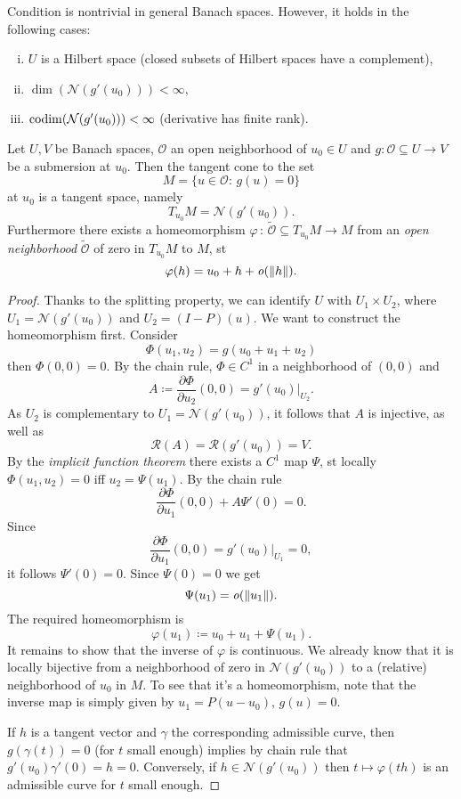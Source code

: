 \documentclass[../skript.tex]{subfiles}
\begin{document}
\begin{remarknonumb}
	Condition  is nontrivial in general Banach spaces. However, it holds in the following cases:
	\begin{enumerate}[(i)]
		\item $U$ is a Hilbert space (closed subsets of Hilbert spaces have a complement),
		\item $\dim(\mathcal{N}(g'(u_0))) < \infty$,
		\item $\operatorname{codim}(\mathcal{N}(g'(u_0))) < \infty$ (derivative has finite rank).
	\end{enumerate}

\end{remarknonumb}

\begin{theorem}[Ljusternik, 1934] %
\label{thm:c1e29}
	Let $U,V$ be Banach spaces, $\mathcal{O}$ an open neighborhood of $u_0\in U$ and $g:\mathcal{O}\subseteq U\to V$ be a submersion at $u_0$. Then the tangent cone to the set
	\[
		M=\{u\in\mathcal{O}:\,g(u)=0\}
	\]
	at $u_0$ is a tangent space, namely
	\[
		T_{u_0}M = \mathcal{N}(g'(u_0)).
	\]
	Furthermore there exists a homeomorphism $\varphi\,:\,\tilde{\mathcal{O}}\subseteq T_{u_0}M\to M$ from an \emph{open neighborhood} $\tilde{\mathcal{O}}$ of zero in $T_{u_0}M$ to $M$, \ac{st}
	\[
		\varphi(h) = u_0+h + \mathit{o}(\|h\|).
	\]
\end{theorem}
\begin{proof}
	Thanks to the splitting property, we can identify $U$ with $U_1\times U_2$, where $U_1=\mathcal{N}(g'(u_0))$ and $U_2 = (I-P)(u)$. We want to construct the homeomorphism first. Consider
	\[
		\Phi(u_1,u_2) = g(u_0+u_1+u_2)
	\]
	then $\Phi(0,0) = 0$. By the chain rule, $\Phi\in C^1$ in a neighborhood of $(0,0)$ and 
	\[
		A \coloneqq \frac{\partial\Phi}{\partial u_2}(0,0) = \left.g'(u_0)\right|_{U_2}.
	\]
	As $U_2$ is complementary to $U_1 = \mathcal{N}(g'(u_0))$, it follows that $A$ is injective, as well as
	\[
		\mathcal{R}(A) = \mathcal{R}(g'(u_0)) = V.
	\]
	By the \emph{implicit function theorem} there exists a $C^1$ map $\Psi$, \ac{st} locally $\Phi(u_1,u_2) = 0$ \ac{iff} $u_2=\Psi(u_1)$. By the chain rule 
	\[
		\frac{\partial\Phi}{\partial u_1}(0,0) + A \Psi'(0) = 0.
	\]
	Since
	\[
		\frac{\partial\Phi}{\partial u_1}(0,0) = \left.g'(u_0)\right|_{U_1} = 0,
	\]
	it follows $\Psi'(0) = 0$. Since $\Psi(0) = 0$ we get
	\[
		\Psi(u_1) = \mathit{o}(\|u_1\|).
	\]
	The required homeomorphism is
	\[
		\varphi(u_1) \coloneqq u_0 + u_1 + \Psi(u_1).
	\]
	It remains to show that the inverse of $\varphi$ is continuous. We already know that it is locally bijective from a neighborhood of zero in $\mathcal{N}(g'(u_0))$ to a (relative) neighborhood of $u_0$ in $M$. To see that it's a homeomorphism, note that the inverse map is simply given by $u_1 = P(u-u_0),\,g(u) = 0$.

	If $h$ is a tangent vector and $\gamma$ the corresponding admissible curve, then $g(\gamma(t))=0$ (for $t$ small enough) implies by chain rule that $g'(u_0)\gamma'(0)=h=0$.
	Conversely, if $h\in\mathcal{N}(g'(u_0))$ then $t\mapsto \varphi(th)$ is an admissible curve for $t$ small enough.   
\end{proof}
\end{document}
